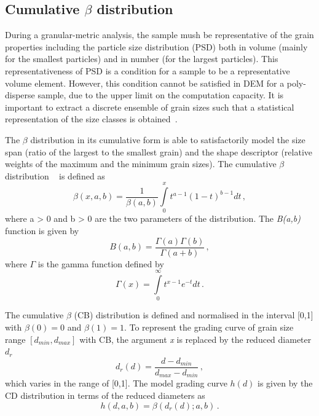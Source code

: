 \subsection[Cumulative beta distribution]{Cumulative $\beta$ distribution}
\label{sec:beta_dist}
During a granular-metric analysis, the sample mush be representative of the 
grain properties including the particle size distribution (PSD) both in volume 
(mainly for the smallest particles) and in number (for the largest particles). 
This representativeness of PSD is a condition for a sample to be a 
representative volume element. However, this condition cannot be satisfied in 
DEM for a poly-disperse sample, due to the upper limit on the computation 
capacity. It is important to extract a discrete ensemble of grain sizes such 
that a statistical representation of the size classes is 
obtained~\citep{Radjai2011}.

The $\beta$ distribution in its cumulative form is able to satisfactorily model 
the size span (ratio of the largest to the smallest grain) and the shape 
descriptor (relative weights of the maximum and the minimum grain sizes). The 
cumulative $\beta$ distribution ~\citep{Voivret2007} is defined as
%
\begin{equation}
\beta(x,a,b) = \frac{1}{\beta (a,b)}\int\limits_{0}^{x}t^{a-1}(1-t)^{b-1}dt \,,
\end{equation}
%
where a > 0 and b > 0 are the two parameters of the distribution. The 
\textit{B(a,b)} function is given by
%
\begin{equation}
B(a,b) = \frac{\Gamma(a)\Gamma(b)}{\Gamma(a+b)} \,,
\end{equation}
%
where $\Gamma$ is the gamma function defined by
%
\begin{equation}
\Gamma(x) = \int\limits_{0}^{\infty}t^{x-1}e^{-t}dt \,.
\end{equation}

The cumulative $\beta$ (CB) distribution is defined and normalised in the 
interval [0,1] with $\beta(0) = 0$ and  $\beta(1) = 1$. To represent the 
grading curve of grain size range $[d_{min},d_{max}]$ with CB, the argument 
\textit{x} is replaced by the reduced diameter $d_r$
%
\begin{equation}
d_r(d) = \frac{d - d_{min}}{d_{max} - d_{min}} \,,
\end{equation}
%
which varies in the range of [0,1]. The model grading curve $h(d)$ is given by 
the CD distribution in terms of the reduced diameters as
%
\begin{equation}
h(d,a,b) = \beta(d_r(d);a,b) \,.
\end{equation}

